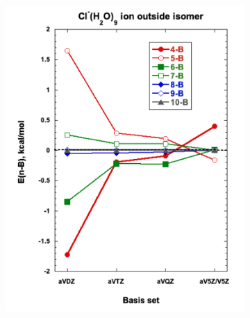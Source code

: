 \documentclass[11pt, proquest]{uwthesis}[2020/02/24]
\begin{document}
\begin{figure}
  \begin{subfigure}[t]{.5\textwidth}
    \centering
    \includegraphics[width=\linewidth]{Figures/Chapter_3/figure_8_tl.pdf}
  \end{subfigure}
  \hfill
  \begin{subfigure}[t]{.5\textwidth}
    \centering

\end{subfigure}
\end{figure}
\end{document}
